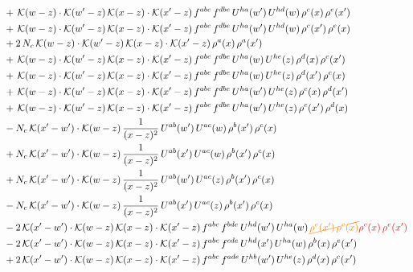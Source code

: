 \documentclass[9pt]{article}
\numberwithin{equation}{section}
\begin{document}
\begin{align}
&+\,\mathcal{K}(w-z)\cdot\mathcal{K}(w'-z)\,\mathcal{K}(x-z)\cdot\mathcal{K}(x'-z)\,f^{abc}\,f^{dbe}\,U^{ha}(w')\,U^{hd}(w)\,\rho^{c}(x)\,\rho^{e}(x')\notag\\
&+\,\mathcal{K}(w-z)\cdot\mathcal{K}(w'-z)\,\mathcal{K}(x-z)\cdot\mathcal{K}(x'-z)\,f^{abc}\,f^{dbe}\,U^{ha}(w')\,U^{hd}(w)\,\rho^{c}(x')\,\rho^{e}(x)\notag\\
&+2\,N_{c}\,\mathcal{K}(w-z)\cdot\mathcal{K}(w'-z)\,\mathcal{K}(x-z)\cdot\mathcal{K}(x'-z)\,\rho^{a}(x)\,\rho^{a}(x')\notag\\
&+\,\mathcal{K}(w-z)\cdot\mathcal{K}(w'-z)\,\mathcal{K}(x-z)\cdot\mathcal{K}(x'-z)\,f^{abc}\,f^{dbe}\,U^{ha}(w)\,U^{he}(z)\,\rho^{d}(x)\,\rho^{c}(x')\notag\\
&+\,\mathcal{K}(w-z)\cdot\mathcal{K}(w'-z)\,\mathcal{K}(x-z)\cdot\mathcal{K}(x'-z)\,f^{abc}\,f^{dbe}\,U^{ha}(w)\,U^{he}(z)\,\rho^{d}(x')\,\rho^{c}(x)\notag\\
&+\,\mathcal{K}(w-z)\cdot\mathcal{K}(w'-z)\,\mathcal{K}(x-z)\cdot\mathcal{K}(x'-z)\,f^{abc}\,f^{dbe}\,U^{ha}(w')\,U^{he}(z)\,\rho^{c}(x)\,\rho^{d}(x')\notag\\
&+\,\mathcal{K}(w-z)\cdot\mathcal{K}(w'-z)\,\mathcal{K}(x-z)\cdot\mathcal{K}(x'-z)\,f^{abc}\,f^{dbe}\,U^{ha}(w')\,U^{he}(z)\,\rho^{c}(x')\,\rho^{d}(x)\notag\\
&-N_{c}\,\mathcal{K}(x'-w')\cdot\mathcal{K}(w-z)\,\frac{1}{(x-z)^{2}}\,U^{ab}(w')\,U^{ac}(w)\,\rho^{b}(x')\,\rho^{c}(x)\notag\\
&+N_{c}\,\mathcal{K}(x'-w')\cdot\mathcal{K}(w-z)\,\frac{1}{(x-z)^{2}}\,U^{ab}(x')\,U^{ac}(w)\,\rho^{b}(x')\,\rho^{c}(x)\notag\\
&+N_{c}\,\mathcal{K}(x'-w')\cdot\mathcal{K}(w-z)\,\frac{1}{(x-z)^{2}}\,U^{ab}(w')\,U^{ac}(z)\,\rho^{b}(x')\,\rho^{c}(x)\notag\\
&-N_{c}\,\mathcal{K}(x'-w')\cdot\mathcal{K}(w-z)\,\frac{1}{(x-z)^{2}}\,U^{ab}(x')\,U^{ac}(z)\,\rho^{b}(x')\,\rho^{c}(x)\notag\\
&-2\,\mathcal{K}(x'-w')\cdot\mathcal{K}(w-z)\,\mathcal{K}(x-z)\cdot\mathcal{K}(x'-z)\,f^{abc}\,f^{bde}\,U^{hd}(w')\,U^{ha}(w)\,{\color{orange}\cancel{\rho^{e}(x')\,\rho^{c}(x)}}{\color{red}\rho^{c}(x)\,\rho^{e}(x')}\notag\\
&-2\,\mathcal{K}(x'-w')\cdot\mathcal{K}(w-z)\,\mathcal{K}(x-z)\cdot\mathcal{K}(x'-z)\,f^{abc}\,f^{cde}\,U^{hd}(x')\,U^{ha}(w)\,\rho^{b}(x)\,\rho^{e}(x')\notag\\
&+2\,\mathcal{K}(x'-w')\cdot\mathcal{K}(w-z)\,\mathcal{K}(x-z)\cdot\mathcal{K}(x'-z)\,f^{abc}\,f^{ade}\,U^{hb}(w')\,U^{he}(z)\,\rho^{d}(x)\,\rho^{c}(x')\notag\\

\end{align}
\end{document}
